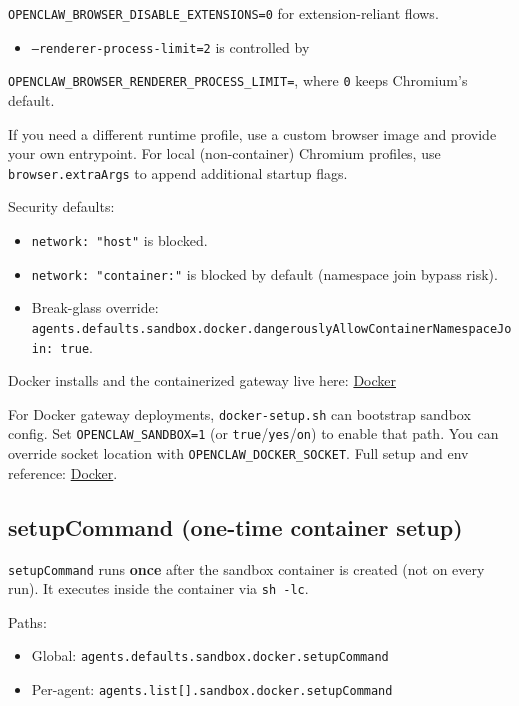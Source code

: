 \texttt{OPENCLAW\_BROWSER\_DISABLE\_EXTENSIONS=0} for extension-reliant flows.
\begin{itemize}
  \item \texttt{--renderer-process-limit=2} is controlled by
\end{itemize}

\texttt{OPENCLAW\_BROWSER\_RENDERER\_PROCESS\_LIMIT=}, where \texttt{0} keeps Chromium's default.

If you need a different runtime profile, use a custom browser image and provide
your own entrypoint. For local (non-container) Chromium profiles, use
\texttt{browser.extraArgs} to append additional startup flags.

Security defaults:

\begin{itemize}
  \item \texttt{network: "host"} is blocked.
  \item \texttt{network: "container:"} is blocked by default (namespace join bypass risk).
  \item Break-glass override: \texttt{agents.defaults.sandbox.docker.dangerouslyAllowContainerNamespaceJoin: true}.
\end{itemize}


Docker installs and the containerized gateway live here:
\href{/install/docker}{Docker}

For Docker gateway deployments, \texttt{docker-setup.sh} can bootstrap sandbox config.
Set \texttt{OPENCLAW\_SANDBOX=1} (or \texttt{true}/\texttt{yes}/\texttt{on}) to enable that path. You can
override socket location with \texttt{OPENCLAW\_DOCKER\_SOCKET}. Full setup and env
reference: \href{/install/docker\#enable-agent-sandbox-for-docker-gateway-opt-in}{Docker}.

\subsection{setupCommand (one-time container setup)}


\texttt{setupCommand} runs \textbf{once} after the sandbox container is created (not on every run).
It executes inside the container via \texttt{sh -lc}.

Paths:

\begin{itemize}
  \item Global: \texttt{agents.defaults.sandbox.docker.setupCommand}
  \item Per-agent: \texttt{agents.list[].sandbox.docker.setupCommand}
\end{itemize}


